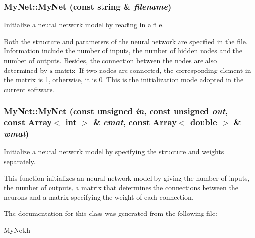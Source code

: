 \subsubsection{\setlength{\rightskip}{0pt plus 5cm}My\-Net::My\-Net (const string \& {\em filename})\hspace{0.3cm}{\tt  [inline]}}\label{classMyNet_a0}


Initialize a neural network model by reading in a file.

Both the structure and parameters of the neural network are specified in the file. Information include the number of inputs, the number of hidden nodes and the number of outputs. Besides, the connection between the nodes are also determined by a matrix. If two nodes are connected, the corresponding element in the matrix is 1, otherwise, it is 0. This is the initialization mode adopted in the current software. 
\subsubsection{\setlength{\rightskip}{0pt plus 5cm}My\-Net::My\-Net (const unsigned {\em in}, const unsigned {\em out}, const Array$<$ int $>$ \& {\em cmat}, const Array$<$ double $>$ \& {\em wmat})\hspace{0.3cm}{\tt  [inline]}}\label{classMyNet_a1}


Initialize a neural network model by specifying the structure and weights separately.

This function initializes an neural network model by giving the number of inputs, the number of outputs, a matrix that determines the connections between the neurons and a matrix specifying the weight of each connection. 

The documentation for this class was generated from the following file:\begin{CompactItemize}
\item 
My\-Net.h\end{CompactItemize}
